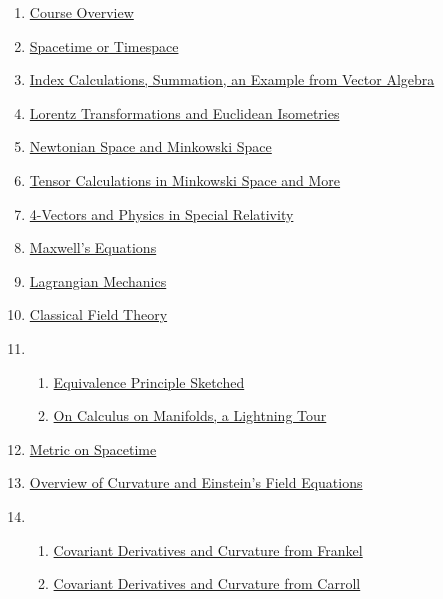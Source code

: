\documentclass[11pt]{article}
\begin{document}
\begin{enumerate}
	\item \href{https://mp.weixin.qq.com/s/ODHfHKOCxy8zZ6ME9lRTnQ}{Course Overview}  %
	\item \href{https://mp.weixin.qq.com/s/E7ivTCqyP-8ZclUUVTKvQQ}{Spacetime or Timespace}  %
	\item \href{https://mp.weixin.qq.com/s/Xp5NfEozTdhh-Ic_ZFn_vQ}{Index Calculations, Summation, an Example from Vector Algebra}  %
	\item \href{https://mp.weixin.qq.com/s/rCjs9mESbFh0LfVzbI4muQ}{Lorentz Transformations and Euclidean Isometries}  %
	\item \href{https://mp.weixin.qq.com/s/IMuSaKp9fGxPcRGse8NmNg}{Newtonian Space and Minkowski Space}  %
	\item \href{https://mp.weixin.qq.com/s/qSpRhHyZVuAquQaMQT2iXQ}{Tensor Calculations in Minkowski Space and More}  %
	\item \href{https://mp.weixin.qq.com/s/c78gWupqwoYFrcID15S5Kw}{4-Vectors and Physics in Special Relativity}  %
	\item \href{https://mp.weixin.qq.com/s/LLJqezrK2VRtrqeE9JmoEA}{Maxwell's Equations}  %
	\item \href{https://mp.weixin.qq.com/s/LiCDB2FahvwI-SpRsKnclA}{Lagrangian Mechanics}  %
	\item \href{https://mp.weixin.qq.com/s/VHz4NLlrxbjUv8vSuz24dw}{Classical Field Theory}  %
	\item 
	\begin{enumerate}
		\item \href{https://mp.weixin.qq.com/s/XmgYuWflwccMv1Jlt5Fptg}{Equivalence Principle Sketched}  %
		\item \href{https://mp.weixin.qq.com/s/Kbwn-weAlNAEOfqd2X1AMg}{On Calculus on Manifolds, a Lightning Tour}  %
	\end{enumerate}
	\item \href{https://mp.weixin.qq.com/s/wzUWhQ28UCDslp_JDCla8A}{Metric on Spacetime}  %
	\item \href{https://mp.weixin.qq.com/s/4SFwUFeEbz4nuWuL0Y7Wyw}{Overview of Curvature and Einstein's Field Equations}  %
	\item 
	\begin{enumerate}
		\item \href{https://mp.weixin.qq.com/s/QQNNsHCO0jIdUnKUzBNS1A}{Covariant Derivatives and Curvature from Frankel}  %
		\item \href{https://mp.weixin.qq.com/s/c3oKvHBUciQ2oVkH20QRvQ}{Covariant Derivatives and Curvature from Carroll}  %

\end{enumerate}
\end{enumerate}
\end{document}
